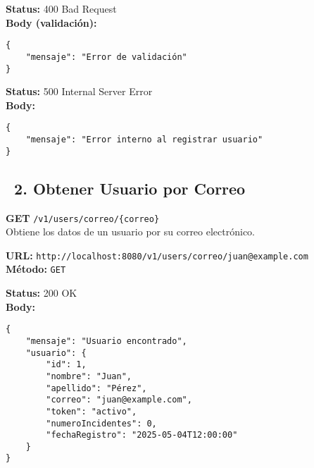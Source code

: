 \begin{tcolorbox}[response]
    \textbf{Status:} 400 Bad Request\\
    \textbf{Body (validación):}
    \begin{verbatim}
{
    "mensaje": "Error de validación"
}
    \end{verbatim}
\end{tcolorbox}

\begin{tcolorbox}[response]
    \textbf{Status:} 500 Internal Server Error\\
    \textbf{Body:}
    \begin{verbatim}
{
    "mensaje": "Error interno al registrar usuario"
}
    \end{verbatim}
\end{tcolorbox}


\subsection*{\faServer\ 2. Obtener Usuario por Correo}
\begin{tcolorbox}[endpoint]
    \textbf{GET} \texttt{/v1/users/correo/\{correo\}}\\
    Obtiene los datos de un usuario por su correo electrónico.
\end{tcolorbox}

\begin{tcolorbox}[request]
    \textbf{URL:} \textcolor{urlColor}{\texttt{http://localhost:8080/v1/users/correo/juan@example.com}}\\
    \textbf{Método:} \textcolor{methodColor}{\texttt{GET}}
\end{tcolorbox}

\begin{tcolorbox}[response]
    \textbf{Status:} 200 OK\\
    \textbf{Body:}
    \begin{verbatim}
{
    "mensaje": "Usuario encontrado",
    "usuario": {
        "id": 1,
        "nombre": "Juan",
        "apellido": "Pérez",
        "correo": "juan@example.com",
        "token": "activo",
        "numeroIncidentes": 0,
        "fechaRegistro": "2025-05-04T12:00:00"
    }
}
    \end{verbatim}
\end{tcolorbox}

